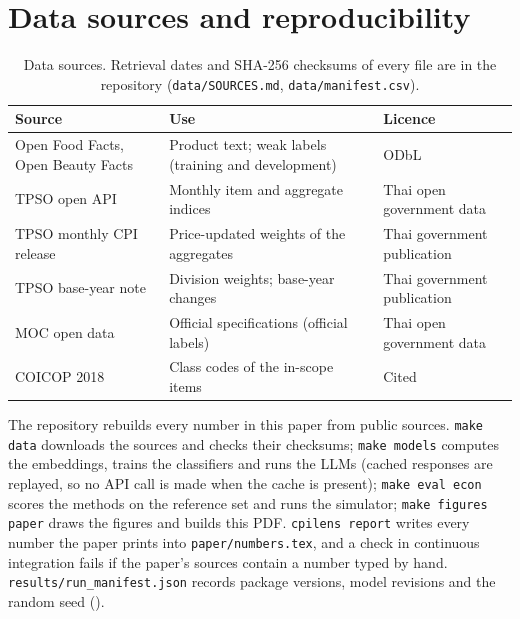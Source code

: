 \section{Data sources and reproducibility}\label{app:repro}

\begin{table}[H]
\centering\small
\caption{Data sources. Retrieval dates and SHA-256 checksums of every file are in the
repository (\texttt{data/SOURCES.md}, \texttt{data/manifest.csv}).}
\label{tab:sources}
\begin{tabularx}{\textwidth}{@{}>{\raggedright\arraybackslash}p{5.4cm}>{\raggedright\arraybackslash}X>{\raggedright\arraybackslash}p{3.4cm}@{}}
\toprule
Source & Use & Licence \\
\midrule
Open Food Facts, Open Beauty Facts \citep{off2026} & Product text; weak labels (training and development) & ODbL \\
TPSO open API \citep{tpso2026api} & Monthly item and aggregate indices & Thai open government data \\
TPSO monthly CPI release & Price-updated weights of the aggregates & Thai government publication \\
TPSO base-year note \citep{tpso2025cpinote} & Division weights; base-year changes & Thai government publication \\
MOC open data \citep{moc2026specs} & Official specifications (official labels) & Thai open government data \\
COICOP 2018 \citep{unsd2018coicop} & Class codes of the in-scope items & Cited \\
\bottomrule
\end{tabularx}
\end{table}

The repository rebuilds every number in this paper from public sources. \texttt{make data}
downloads the sources and checks their checksums; \texttt{make models} computes the
embeddings, trains the classifiers and runs the LLMs (cached responses are replayed, so no
API call is made when the cache is present); \texttt{make eval econ} scores the methods on
the reference set and runs the simulator; \texttt{make figures paper} draws the figures and
builds this PDF. \texttt{cpilens report} writes every number
the paper prints into \texttt{paper/numbers.tex}, and a check in continuous integration
fails if the paper's sources contain a number typed by hand.
\texttt{results/run\_manifest.json} records package versions, model revisions and the
random seed (\CfgSeed).

